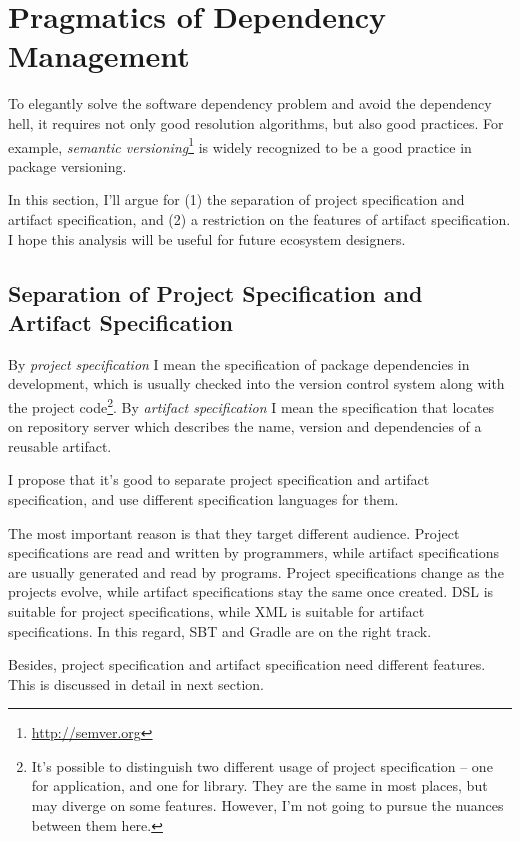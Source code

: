 \section{Pragmatics of Dependency Management}

\label{pragmatics}

To elegantly solve the software dependency problem and avoid the dependency hell, it requires not only good resolution algorithms, but also good practices. For example, \emph{semantic versioning}\footnote{\url{http://semver.org}} is widely recognized to be a good practice in package versioning.

In this section, I'll argue for (1) the separation of project specification and artifact specification, and (2) a restriction on the features of artifact specification. I hope this analysis will be useful for future ecosystem designers.

\subsection{Separation of Project Specification and Artifact Specification}

By \emph{project specification} I mean the specification of package dependencies in development, which is usually checked into the version control system along with the project code\footnote{It's possible to distinguish two different usage of project specification -- one for application, and one for library. They are the same in most places, but may diverge on some features. However, I'm not going to pursue the nuances between them here.}. By \emph{artifact specification} I mean the specification that locates on repository server which describes the name, version and dependencies of a reusable artifact.

I propose that it's good to separate project specification and artifact specification, and use different specification languages for them.

The most important reason is that they target different audience. Project specifications are read and written by programmers, while artifact specifications are usually generated and read by programs. Project specifications change as the projects evolve, while artifact specifications stay the same once created. DSL is suitable for project specifications, while XML is suitable for artifact specifications. In this regard, SBT and Gradle are on the right track.

Besides, project specification and artifact specification need different features. This is discussed in detail in next section.

